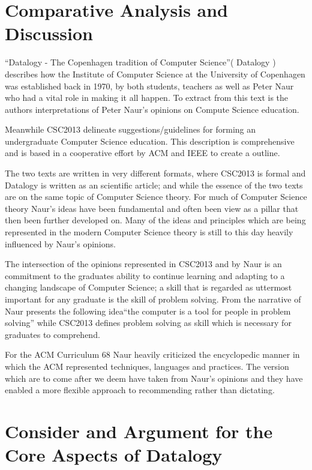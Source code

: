 \documentclass[11pt,a4paper]{article}
\theoremstyle{plain}
\theoremstyle{definition}
\theoremstyle{remark}
\numberwithin{equation}{section}
\begin{document}
\section{Comparative Analysis and Discussion}


``Datalogy - The Copenhagen tradition of Computer Science''( Datalogy )\cite{naur_datalogy} describes how the Institute of Computer Science at the University of Copenhagen was established back in 1970, by both students, teachers as well as Peter Naur who had a vital role in making it all happen. To extract from this text is the authors interpretations of Peter Naur's opinions on Compute Science education.


Meanwhile CSC2013\cite{CSC2013} delineate suggestions/guidelines for forming an undergraduate Computer Science education. This description is comprehensive and is based in a cooperative effort by ACM and IEEE to create a outline.


The two texts are written in very different formats, where CSC2013 is formal and Datalogy is written as an scientific article; and while the essence of the two texts are on the same topic of Computer Science theory.
For much of Computer Science theory Naur's ideas have been fundamental and often been view as a pillar that then been further developed on. Many of the ideas and principles which are being represented in the modern Computer Science theory is still to this day heavily influenced by Naur's opinions.

The intersection of the opinions represented in CSC2013 and by Naur is an commitment to the graduates ability to continue learning and adapting to a changing landscape of Computer Science; a skill that is regarded as uttermost important for any graduate is the skill of problem solving. From the narrative of Naur presents the following idea``the computer is a tool for people in problem solving'' while CSC2013 defines problem solving as skill which is necessary for graduates to comprehend.

For the ACM Curriculum 68 Naur heavily criticized the encyclopedic manner in which the ACM represented techniques, languages and practices. The version which are to come after we deem have taken from Naur's opinions and they have enabled a more flexible approach to recommending rather than dictating.

\pagebreak
\section{Consider and Argument for the Core Aspects of Datalogy}
\end{document}
